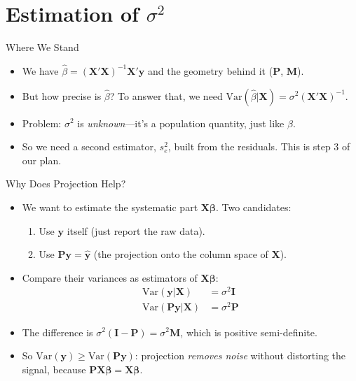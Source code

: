\documentclass[aspectratio=169, handout]{beamer}
\numberwithin{equation}{section}
\begin{document}
\section{Estimation of $\sigma^2$}

\begin{frame}{Where We Stand}
\begin{itemize}
\item We have $\hat{\beta}=(\bm{X'X})^{-1}\bm{X'y}$ and the geometry behind it ($\bm{P}$, $\bm{M}$).\pause
\item But how precise is $\hat{\beta}$? To answer that, we need $\text{Var}(\hat{\beta}|\bm{X})=\sigma^2(\bm{X'X})^{-1}$.\pause
\item Problem: $\sigma^2$ is \emph{unknown}---it's a population quantity, just like $\beta$.\pause
\item So we need a second estimator, $s^2_e$, built from the residuals. This is step 3 of our plan.
\end{itemize}
\end{frame}

\begin{frame}{Why Does Projection Help?}
\begin{itemize}
\item We want to estimate the systematic part $\bm{X\beta}$. Two candidates:
\begin{enumerate}
\item Use $\bm{y}$ itself (just report the raw data).
\item Use $\bm{Py}=\bm{\hat{y}}$ (the projection onto the column space of $\bm{X}$).
\end{enumerate}\pause
\item Compare their variances as estimators of $\bm{X\beta}$:
\begin{align*}
\text{Var}(\bm{y}|\bm{X})&=\sigma^2\bm{I}\\
\text{Var}(\bm{Py}|\bm{X})&=\sigma^2\bm{P}
\end{align*}\pause
\item The difference is $\sigma^2(\bm{I}-\bm{P})=\sigma^2\bm{M}$, which is positive semi-definite.
\item So $\text{Var}(\bm{y})\geq \text{Var}(\bm{Py})$: projection \emph{removes noise} without distorting the signal, because $\bm{PX\beta}=\bm{X\beta}$.
\end{itemize}
\end{frame}
\end{document}
